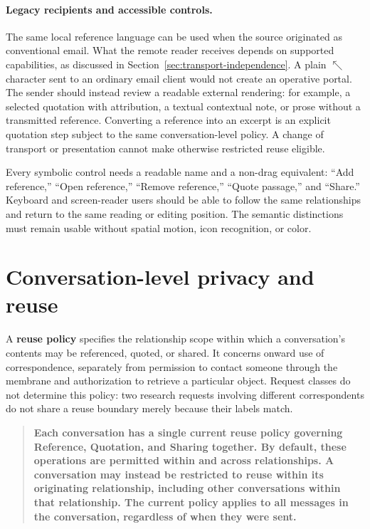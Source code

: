 \documentclass[11pt]{article}
\newcommand{\term}[1]{\textbf{#1}}
\DeclareRobustCommand{\refmark}{\ensuremath{\nwarrow}}
\begin{document}
\paragraph{Legacy recipients and accessible controls.}
The same local reference language can be used when the source originated as conventional email. What the remote reader receives depends on supported capabilities, as discussed in Section~\ref{sec:transport-independence}. A plain \refmark{} character sent to an ordinary email client would not create an operative portal. The sender should instead review a readable external rendering: for example, a selected quotation with attribution, a textual contextual note, or prose without a transmitted reference. Converting a reference into an excerpt is an explicit quotation step subject to the same conversation-level policy. A change of transport or presentation cannot make otherwise restricted reuse eligible.

Every symbolic control needs a readable name and a non-drag equivalent: ``Add reference,'' ``Open reference,'' ``Remove reference,'' ``Quote passage,'' and ``Share.'' Keyboard and screen-reader users should be able to follow the same relationships and return to the same reading or editing position. The semantic distinctions must remain usable without spatial motion, icon recognition, or color.

\FloatBarrier


\section{Conversation-level privacy and reuse}
\label{sec:reuse-policy}

A \term{reuse policy} specifies the relationship scope within which a conversation's contents may be referenced, quoted, or shared. It concerns onward use of correspondence, separately from permission to contact someone through the membrane and authorization to retrieve a particular object.
Request classes do not determine this policy: two research requests involving different correspondents do not share a reuse boundary merely because their labels match.

\begin{quote}
\textbf{Each conversation has a single current reuse policy governing Reference, Quotation, and Sharing together. By default, these operations are permitted within and across relationships. A conversation may instead be restricted to reuse within its originating relationship, including other conversations within that relationship. The current policy applies to all messages in the conversation, regardless of when they were sent.}
\end{quote}
\end{document}
